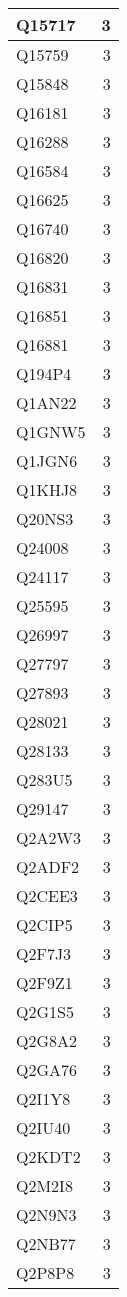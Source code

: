 \documentclass[
]{book}
\theoremstyle{definition}
\theoremstyle{definition}
\theoremstyle{definition}
\theoremstyle{definition}
\theoremstyle{remark}
\begin{document}
\begin{table}
\begin{tabular}{l|r}
\hline
Q15717 & 3\\
\hline
Q15759 & 3\\
\hline
Q15848 & 3\\
\hline
Q16181 & 3\\
\hline
Q16288 & 3\\
\hline
Q16584 & 3\\
\hline
Q16625 & 3\\
\hline
Q16740 & 3\\
\hline
Q16820 & 3\\
\hline
Q16831 & 3\\
\hline
Q16851 & 3\\
\hline
Q16881 & 3\\
\hline
Q194P4 & 3\\
\hline
Q1AN22 & 3\\
\hline
Q1GNW5 & 3\\
\hline
Q1JGN6 & 3\\
\hline
Q1KHJ8 & 3\\
\hline
Q20NS3 & 3\\
\hline
Q24008 & 3\\
\hline
Q24117 & 3\\
\hline
Q25595 & 3\\
\hline
Q26997 & 3\\
\hline
Q27797 & 3\\
\hline
Q27893 & 3\\
\hline
Q28021 & 3\\
\hline
Q28133 & 3\\
\hline
Q283U5 & 3\\
\hline
Q29147 & 3\\
\hline
Q2A2W3 & 3\\
\hline
Q2ADF2 & 3\\
\hline
Q2CEE3 & 3\\
\hline
Q2CIP5 & 3\\
\hline
Q2F7J3 & 3\\
\hline
Q2F9Z1 & 3\\
\hline
Q2G1S5 & 3\\
\hline
Q2G8A2 & 3\\
\hline
Q2GA76 & 3\\
\hline
Q2I1Y8 & 3\\
\hline
Q2IU40 & 3\\
\hline
Q2KDT2 & 3\\
\hline
Q2M2I8 & 3\\
\hline
Q2N9N3 & 3\\
\hline
Q2NB77 & 3\\
\hline
Q2P8P8 & 3\\

\end{tabular}
\end{table}
\end{document}
